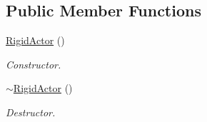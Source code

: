 \subsection*{Public Member Functions}
\begin{DoxyCompactItemize}
\item 
\hypertarget{classContent_1_1Actor_1_1Renderer_1_1RigidActor_a5668062fad6d3f561026ae079d5c9c75}{
\hyperlink{classContent_1_1Actor_1_1Renderer_1_1RigidActor_a5668062fad6d3f561026ae079d5c9c75}{RigidActor} ()}
\label{classContent_1_1Actor_1_1Renderer_1_1RigidActor_a5668062fad6d3f561026ae079d5c9c75}

\begin{DoxyCompactList}\small\item\em Constructor. \item\end{DoxyCompactList}\item 
\hypertarget{classContent_1_1Actor_1_1Renderer_1_1RigidActor_a97c332621093ce61afa8a917cec3f647}{
\hyperlink{classContent_1_1Actor_1_1Renderer_1_1RigidActor_a97c332621093ce61afa8a917cec3f647}{$\sim$RigidActor} ()}
\label{classContent_1_1Actor_1_1Renderer_1_1RigidActor_a97c332621093ce61afa8a917cec3f647}

\begin{DoxyCompactList}\small\item\em Destructor. \item\end{DoxyCompactList}\end{DoxyCompactItemize}
